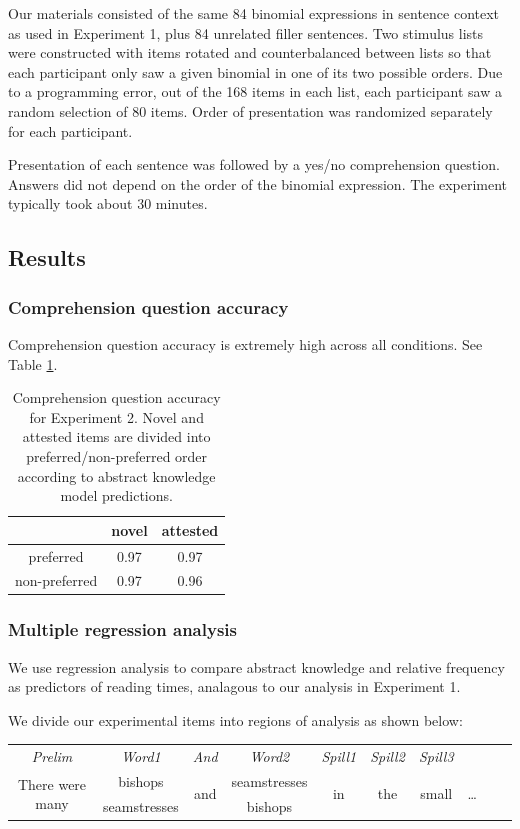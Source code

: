 \documentclass[authoryear]{elsarticle}
\begin{document}
Our materials consisted of the same 84 binomial expressions in sentence context as used in Experiment 1, plus 84 unrelated filler sentences. Two stimulus lists were constructed with items rotated and counterbalanced between lists so that each participant only saw a given binomial in one of its two possible orders. Due to a programming error, out of the 168 items in each list, each participant saw a random selection of 80 items. Order of presentation was randomized separately for each participant.

Presentation of each sentence was followed by a yes/no comprehension question. Answers did not depend on the order of the binomial expression. The experiment typically took about 30 minutes.


\subsection{Results}

\subsubsection{Comprehension question accuracy}
Comprehension question accuracy is extremely high across all conditions. See Table \ref{t:qcorrect}.


\begin{table}[t]
\centering
\begin{tabular}{ccc}\hline\hline
& novel & attested \\\hline
preferred & 0.97 & 0.97 \\
non-preferred & 0.97 & 0.96 \\\hline
\end{tabular}
\caption{Comprehension question accuracy for Experiment 2. Novel and attested items are divided into preferred/non-preferred order according to abstract knowledge model predictions.}\label{t:qcorrect}
\end{table}

\subsubsection{Multiple regression analysis}\label{multivariate}
We use regression analysis to compare abstract knowledge and relative frequency as predictors of reading times, analagous to our analysis in Experiment 1.

We divide our experimental items into regions of analysis as shown below:

\noindent\begin{tabular}{c c c c c c c c c c}
 \emph{Prelim} & \emph{Word1} & \emph{And} & \emph{Word2} & \emph{Spill1} & \emph{Spill2} & \emph{Spill3 } & \\
\multirow{2}{*}{There were many} & bishops & \multirow{2}{*}{and} & seamstresses & \multirow{2}{*}{in} & \multirow{2}{*}{the} & \multirow{2}{*}{small} & \multirow{2}{*}{\ldots}\\
&seamstresses&&bishops
\end{tabular}
\end{document}
